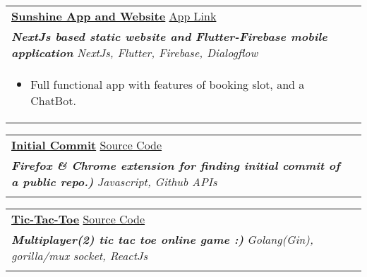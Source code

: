 \documentclass[a4paper,8pt]{article}
\begin{document}
\begin{tabularx}{\linewidth}{ @{}l r@{} }
\color[HTML]{1C033C} \textbf{\uline{\href{https://sunshine.iith.ac.in/}{Sunshine App and Website}}} \hfill \color[HTML]{371e77} {\href{https://play.google.com/store/apps/details?id=com.sunshine.iith}{App Link}}  \\[4pt] \color[HTML]{371e77} \textbf{\textit{NextJs based static website and Flutter-Firebase mobile application}} \hfill \color[HTML]{4B28A4} \textit{NextJs, Flutter, Firebase, Dialogflow} \\[5pt]
\begin{minipage}[t]{\linewidth}
    \begin{itemize}[nosep,after=\strut, leftmargin=2em, itemsep=2pt]
        \item Full functional app with features of booking slot, and a ChatBot. 
    \end{itemize}
    \end{minipage}
\end{tabularx}


\begin{tabularx}{\linewidth}{ @{}l r@{} }
\color[HTML]{1C033C} \textbf{\uline{Initial Commit}} \hfill \color[HTML]{371e77} {\href{https://github.com/bhaskaraa45/initial-commit}{Source Code}}  \\[4pt] \color[HTML]{371e77} \textbf{\textit{Firefox \& Chrome extension for finding initial commit of a public repo.)}} \hfill \color[HTML]{4B28A4} \textit{Javascript, Github APIs} \\[5pt]
\begin{minipage}[t]{\linewidth}
    \begin{itemize}[nosep,after=\strut, leftmargin=2em, itemsep=2pt]
    \end{itemize}
    \end{minipage}
\end{tabularx}

\begin{tabularx}{\linewidth}{ @{}l r@{} }
\color[HTML]{1C033C} \textbf{\uline{\href{https://tictactoe.bhaskaraa45.me/}{Tic-Tac-Toe}}} \hfill \color[HTML]{371e77} {\href{https://github.com/bhaskaraa45/tic-tac-toe}{Source Code}}  \\[4pt] \color[HTML]{371e77} \textbf{\textit{Multiplayer(2) tic tac toe online game :)}} \hfill \color[HTML]{4B28A4} \textit{Golang(Gin), gorilla/mux socket, ReactJs} \\[5pt]
\begin{minipage}[t]{\linewidth}
    \begin{itemize}[nosep,after=\strut, leftmargin=2em, itemsep=2pt]
    \end{itemize}
    \end{minipage}
\end{tabularx}
\end{document}
